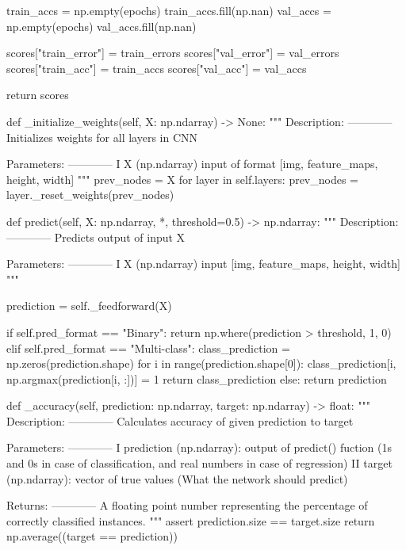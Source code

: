 \documentclass[%
oneside,                 %
final,                   %
10pt]{article}
\begin{document}
        train_accs = np.empty(epochs)
        train_accs.fill(np.nan)
        val_accs = np.empty(epochs)
        val_accs.fill(np.nan)

        scores["train_error"] = train_errors
        scores["val_error"] = val_errors
        scores["train_acc"] = train_accs
        scores["val_acc"] = val_accs

        return scores

    def _initialize_weights(self, X: np.ndarray) -> None:
        """
        Description:
        ------------
            Initializes weights for all layers in CNN

        Parameters:
        ------------
            I   X (np.ndarray) input of format [img, feature_maps, height, width]
        """
        prev_nodes = X
        for layer in self.layers:
            prev_nodes = layer._reset_weights(prev_nodes)

    def predict(self, X: np.ndarray, *, threshold=0.5) -> np.ndarray:
        """
        Description:
        ------------
            Predicts output of input X

        Parameters:
        ------------
            I   X (np.ndarray) input [img, feature_maps, height, width]
        """

        prediction = self._feedforward(X)

        if self.pred_format == "Binary":
            return np.where(prediction > threshold, 1, 0)
        elif self.pred_format == "Multi-class":
            class_prediction = np.zeros(prediction.shape)
            for i in range(prediction.shape[0]):
                class_prediction[i, np.argmax(prediction[i, :])] = 1
            return class_prediction
        else:
            return prediction

    def _accuracy(self, prediction: np.ndarray, target: np.ndarray) -> float:
        """
        Description:
        ------------
            Calculates accuracy of given prediction to target

        Parameters:
        ------------
            I   prediction (np.ndarray): output of predict() fuction
            (1s and 0s in case of classification, and real numbers in case of regression)
            II  target (np.ndarray): vector of true values (What the network should predict)

        Returns:
        ------------
            A floating point number representing the percentage of correctly classified instances.
        """
        assert prediction.size == target.size
        return np.average((target == prediction))
\end{document}
